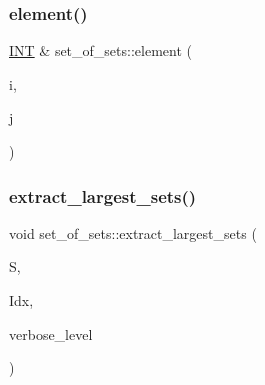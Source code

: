 \subsubsection{\texorpdfstring{element()}{element()}}
{\footnotesize\ttfamily \mbox{\hyperlink{galois_8h_a09fddde158a3a20bd2dcadb609de11dc}{I\+NT}} \& set\+\_\+of\+\_\+sets\+::element (\begin{DoxyParamCaption}\item[{\mbox{\hyperlink{galois_8h_a09fddde158a3a20bd2dcadb609de11dc}{I\+NT}}}]{i,  }\item[{\mbox{\hyperlink{galois_8h_a09fddde158a3a20bd2dcadb609de11dc}{I\+NT}}}]{j }\end{DoxyParamCaption})}

\mbox{\label{classset__of__sets_a36c696c5b0a1f89a1214665b343dd551}} 
\subsubsection{\texorpdfstring{extract\+\_\+largest\+\_\+sets()}{extract\_largest\_sets()}}
{\footnotesize\ttfamily void set\+\_\+of\+\_\+sets\+::extract\+\_\+largest\+\_\+sets (\begin{DoxyParamCaption}\item[{\mbox{\hyperlink{classset__of__sets}{set\+\_\+of\+\_\+sets}} \&}]{S,  }\item[{\mbox{\hyperlink{galois_8h_a09fddde158a3a20bd2dcadb609de11dc}{I\+NT}} $\ast$\&}]{Idx,  }\item[{\mbox{\hyperlink{galois_8h_a09fddde158a3a20bd2dcadb609de11dc}{I\+NT}}}]{verbose\+\_\+level }\end{DoxyParamCaption})}

\mbox{\label{classset__of__sets_a51cb48385d3208c1c709393a7c32299d}} 

